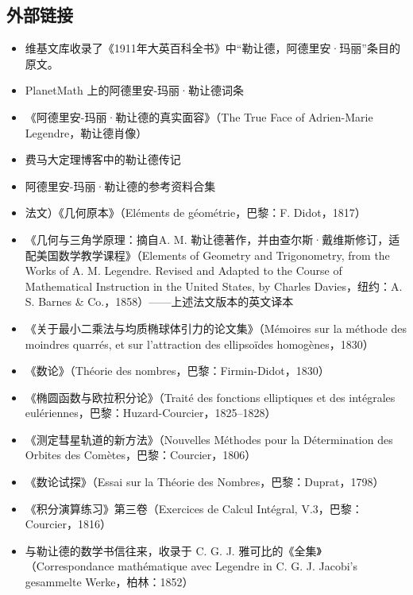 \subsection{外部链接}
\begin{itemize}
\item 维基文库收录了《1911年大英百科全书》中“勒让德，阿德里安·玛丽”条目的原文。
\item PlanetMath 上的阿德里安-玛丽·勒让德词条
\item 《阿德里安-玛丽·勒让德的真实面容》（The True Face of Adrien-Marie Legendre，勒让德肖像）
\item 费马大定理博客中的勒让德传记
\item 阿德里安-玛丽·勒让德的参考资料合集
\item 法文）《几何原本》（Eléments de géométrie，巴黎：F. Didot，1817）
\item 《几何与三角学原理：摘自A. M. 勒让德著作，并由查尔斯·戴维斯修订，适配美国数学教学课程》（Elements of Geometry and Trigonometry, from the Works of A. M. Legendre. Revised and Adapted to the Course of Mathematical Instruction in the United States, by Charles Davies，纽约：A. S. Barnes & Co.，1858）——上述法文版本的英文译本
\item 《关于最小二乘法与均质椭球体引力的论文集》（Mémoires sur la méthode des moindres quarrés, et sur l'attraction des ellipsoïdes homogènes，1830）
\item 《数论》（Théorie des nombres，巴黎：Firmin-Didot，1830）
\item 《椭圆函数与欧拉积分论》（Traité des fonctions elliptiques et des intégrales eulériennes，巴黎：Huzard-Courcier，1825–1828）
\item 《测定彗星轨道的新方法》（Nouvelles Méthodes pour la Détermination des Orbites des Comètes，巴黎：Courcier，1806）
\item 《数论试探》（Essai sur la Théorie des Nombres，巴黎：Duprat，1798）
\item 《积分演算练习》第三卷（Exercices de Calcul Intégral, V.3，巴黎：Courcier，1816）
\item 与勒让德的数学书信往来，收录于 C. G. J. 雅可比的《全集》（Correspondance mathématique avec Legendre in C. G. J. Jacobi’s gesammelte Werke，柏林：1852）
\end{itemize}
